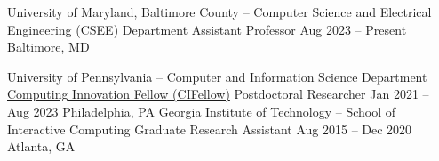 {\color{black}\fontsize{12pt}{1em}} 


\begin{cventries}


  \cventry
    {University of Maryland, Baltimore County -- Computer Science and Electrical Engineering (CSEE) Department} %
    {Assistant Professor} %
    {Aug 2023 – Present} %
    {Baltimore, MD} %
    {
    }

  \cventry
    {University of Pennsylvania -- Computer and Information Science Department} %
    {\href{https://cifellows2020.org/}{Computing Innovation Fellow (CIFellow)} Postdoctoral Researcher} %
    {Jan 2021 – Aug 2023} %
    {Philadelphia, PA} %
    {
    }
  \cventry
    {Georgia Institute of Technology -- School of Interactive Computing} %
    {Graduate Research Assistant} %
    {Aug 2015 – Dec 2020} %
    {Atlanta, GA} %
    {
    }


\end{cventries}

